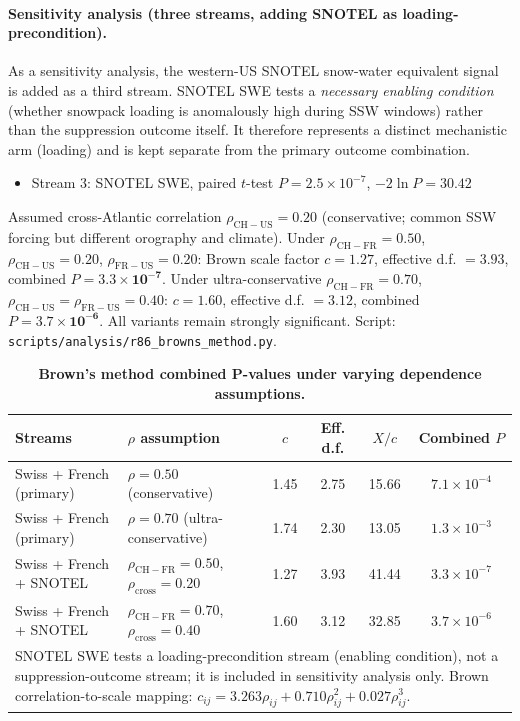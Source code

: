 \documentclass[11pt,letterpaper]{article}
\begin{document}
\paragraph{Sensitivity analysis (three streams, adding SNOTEL as loading-precondition).}
As a sensitivity analysis, the western-US SNOTEL snow-water equivalent signal is added as a third stream. SNOTEL SWE tests a \emph{necessary enabling condition} (whether snowpack loading is anomalously high during SSW windows) rather than the suppression outcome itself. It therefore represents a distinct mechanistic arm (loading) and is kept separate from the primary outcome combination.
\begin{itemize}
  \item Stream 3: SNOTEL SWE, paired $t$-test $P = 2.5\times10^{-7}$, $-2\ln P = 30.42$
\end{itemize}
Assumed cross-Atlantic correlation $\rho_{\mathrm{CH-US}} = 0.20$ (conservative; common SSW forcing but different orography and climate). Under $\rho_{\mathrm{CH-FR}} = 0.50$, $\rho_{\mathrm{CH-US}} = 0.20$, $\rho_{\mathrm{FR-US}} = 0.20$: Brown scale factor $c = 1.27$, effective d.f. $= 3.93$, combined $P = \mathbf{3.3\times10^{-7}}$.
Under ultra-conservative $\rho_{\mathrm{CH-FR}} = 0.70$, $\rho_{\mathrm{CH-US}} = \rho_{\mathrm{FR-US}} = 0.40$: $c = 1.60$, effective d.f. $= 3.12$, combined $P = \mathbf{3.7\times10^{-6}}$.
All variants remain strongly significant. Script: \texttt{scripts/analysis/r86\_browns\_method.py}.

\begin{table}[!ht]
\centering
\caption{\textbf{Brown's method combined P-values under varying dependence assumptions.}}
\label{tab:browns_method}
\small
\begin{tabular}{llcccc}
\toprule
Streams & $\rho$ assumption & $c$ & Eff. d.f. & $X / c$ & Combined $P$ \\
\midrule
Swiss + French (primary) & $\rho = 0.50$ (conservative) & 1.45 & 2.75 & 15.66 & $7.1\times10^{-4}$ \\
Swiss + French (primary) & $\rho = 0.70$ (ultra-conservative) & 1.74 & 2.30 & 13.05 & $1.3\times10^{-3}$ \\
Swiss + French + SNOTEL & $\rho_{\mathrm{CH-FR}}=0.50$, $\rho_{\mathrm{cross}}=0.20$ & 1.27 & 3.93 & 41.44 & $3.3\times10^{-7}$ \\
Swiss + French + SNOTEL & $\rho_{\mathrm{CH-FR}}=0.70$, $\rho_{\mathrm{cross}}=0.40$ & 1.60 & 3.12 & 32.85 & $3.7\times10^{-6}$ \\
\bottomrule
\multicolumn{6}{p{13cm}}{\footnotesize SNOTEL SWE tests a loading-precondition stream (enabling condition), not a suppression-outcome stream; it is included in sensitivity analysis only. Brown correlation-to-scale mapping: $c_{ij} = 3.263\rho_{ij} + 0.710\rho_{ij}^2 + 0.027\rho_{ij}^3$.} \\
\end{tabular}
\end{table}
\end{document}
